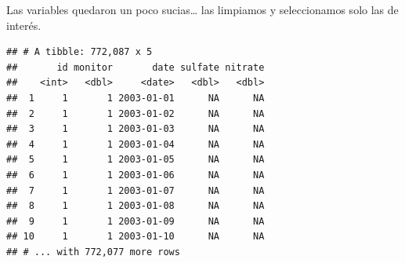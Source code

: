 \documentclass[]{article}
\newenvironment{Shaded}{\begin{snugshade}}{\end{snugshade}}
\newcommand{\KeywordTok}[1]{\textcolor[rgb]{0.13,0.29,0.53}{\textbf{{#1}}}}
\newcommand{\DataTypeTok}[1]{\textcolor[rgb]{0.13,0.29,0.53}{{#1}}}
\newcommand{\StringTok}[1]{\textcolor[rgb]{0.31,0.60,0.02}{{#1}}}
\newcommand{\NormalTok}[1]{{#1}}
\begin{document}
Las variables quedaron un poco sucias\ldots{} las limpiamos y
seleccionamos solo las de interés.

\begin{Shaded}
\end{Shaded}

\begin{verbatim}
## # A tibble: 772,087 x 5
##       id monitor       date sulfate nitrate
##    <int>   <dbl>     <date>   <dbl>   <dbl>
##  1     1       1 2003-01-01      NA      NA
##  2     1       1 2003-01-02      NA      NA
##  3     1       1 2003-01-03      NA      NA
##  4     1       1 2003-01-04      NA      NA
##  5     1       1 2003-01-05      NA      NA
##  6     1       1 2003-01-06      NA      NA
##  7     1       1 2003-01-07      NA      NA
##  8     1       1 2003-01-08      NA      NA
##  9     1       1 2003-01-09      NA      NA
## 10     1       1 2003-01-10      NA      NA
## # ... with 772,077 more rows
\end{verbatim}
\end{document}
